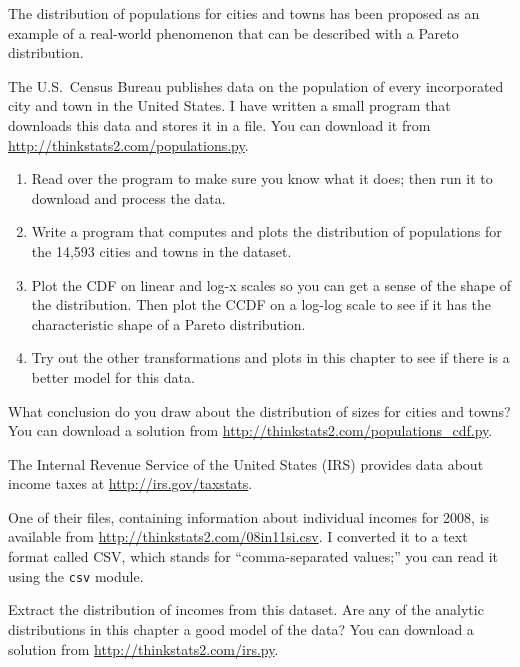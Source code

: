 \documentclass[12pt]{book}
\begin{document}
\begin{exercise}
The distribution of populations for cities and towns has been proposed
as an example of a real-world phenomenon that can be described
with a Pareto distribution.

The U.S.~Census Bureau publishes data on the population of every
incorporated city and town in the United States.  I have written a
small program that downloads this data and stores it in a file.  You
can download it from \url{http://thinkstats2.com/populations.py}.

\begin{enumerate}

\item Read over the program to make sure you know what it does; then
  run it to download and process the data.

\item Write a program that computes and plots the distribution of
  populations for the 14,593 cities and towns in the dataset.

\item Plot the CDF on linear and log-x scales so you can get a sense
  of the shape of the distribution.  Then plot the CCDF on a log-log
  scale to see if it has the characteristic shape of a Pareto
  distribution.

\item Try out the other transformations and plots in this chapter to
  see if there is a better model for this data.

\end{enumerate}

What conclusion do you draw about the distribution of sizes
for cities and towns?  You can download a solution from
\url{http://thinkstats2.com/populations_cdf.py}.

\end{exercise}


\begin{exercise}
\label{irs}

The Internal Revenue Service of the United States (IRS) provides data
about income taxes at \url{http://irs.gov/taxstats}.

One of their files, containing information about individual incomes
for 2008, is available from \url{http://thinkstats2.com/08in11si.csv}.  I
converted it to a text format called CSV, which stands for
``comma-separated values;'' you can read it using the {\tt csv}
module.

Extract the distribution of incomes from this dataset.  Are any of
the analytic distributions in this chapter a good model of
the data?  You can download a solution from \url{http://thinkstats2.com/irs.py}.

\end{exercise}
\end{document}
